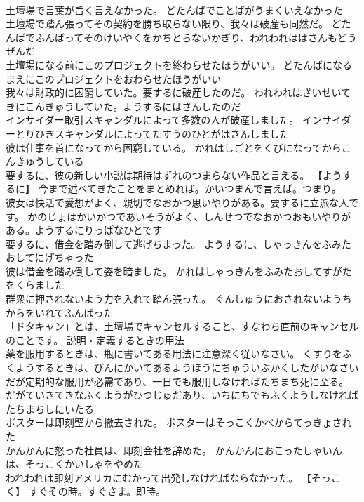 \documentclass[8pt]{extreport}
\begin{document}
\begin{CJK}{UTF8}{min}
\\	土壇場で言葉が旨く言えなかった。	どたんばでことばがうまくいえなかった 
\\	土壇場で踏ん張ってその契約を勝ち取らない限り、我々は破産も同然だ。	どたんばでふんばってそのけいやくをかちとらないかぎり、われわれははさんもどうぜんだ 
\\	土壇場になる前にこのプロジェクトを終わらせたほうがいい。	どたんばになるまえにこのプロジェクトをおわらせたほうがいい 
\\	我々は財政的に困窮していた。要するに破産したのだ。	われわれはざいせいてきにこんきゅうしていた。ようするにはさんしたのだ 
\\	インサイダー取引スキャンダルによって多数の人が破産しました。	インサイダーとりひきスキャンダルによってたすうのひとがはさんしました 
\\	彼は仕事を首になってから困窮している。	かれはしごとをくびになってからこんきゅうしている 
\\	要するに、彼の新しい小説は期待はずれのつまらない作品と言える。	【ようするに】 今まで述べてきたことをまとめれば。かいつまんで言えば。つまり。
\\	彼女は快活で愛想がよく、親切でなおかつ思いやりがある。要するに立派な人です。	かのじょはかいかつであいそうがよく、しんせつでなおかつおもいやりがある。ようするにりっぱなひとです 
\\	要するに、借金を踏み倒して逃げちまった。	ようするに、しゃっきんをふみたおしてにげちゃった 
\\	彼は借金を踏み倒して姿を暗ました。	かれはしゃっきんをふみたおしてすがたをくらました 
\\	群衆に押されないよう力を入れて踏ん張った。	ぐんしゅうにおされないようちからをいれてふんばった 
\\	「ドタキャン」とは、土壇場でキャンセルすること、すなわち直前のキャンセルのことです。	説明・定義するときの用法
\\	薬を服用するときは、瓶に書いてある用法に注意深く従いなさい。	くすりをふくようするときは、びんにかいてあるようほうにちゅういぶかくしたがいなさい 
\\	だが定期的な服用が必需であり、一日でも服用しなければたちまち死に至る。	だがていきてきなふくようがひつじゅだあり、いちにちでもふくようしなければたちまちしにいたる 
\\	ポスターは即刻壁から撤去された。	ポスターはそっこくかべからてっきょされた 
\\	かんかんに怒った社員は、即刻会社を辞めた。	かんかんにおこったしゃいんは、そっこくかいしゃをやめた 
\\	われわれは即刻アメリカにむかって出発しなければならなかった。	【そっこく】 すぐその時。すぐさま。即時。

\end{CJK}
\end{document}
